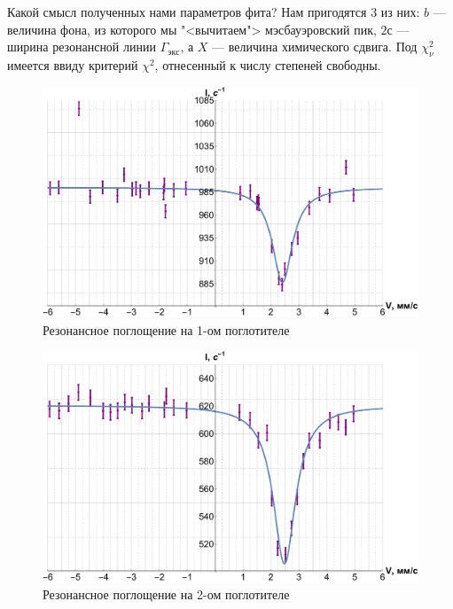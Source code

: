 \documentclass[12pt]{kiarticle}
\begin{document}
 	Какой смысл полученных нами параметров фита? Нам пригодятся 3 из них: $ b $ --- величина фона, из которого мы "<вычитаем"> мэсбауэровский пик, $ 2с $ --- ширина резонансной линии $ \Gamma_{экс} $, а $ X $ --- величина химического сдвига. Под $ \chi_\nu^2 $ имеется ввиду критерий $ \chi^2 $, отнесенный к числу степеней свободны.
 
 	\begin{figure}[h]
 		\label{graf_1}
 		\includegraphics[scale=0.47]{gr1.pdf}
 		\caption{Резонансное поглощение на 1-ом поглотителе}
 	\end{figure}
 
 	\begin{figure}[h]
 		\label{graf_2}
 		\includegraphics[scale=0.47]{gr2.pdf}
 		\caption{Резонансное поглощение на 2-ом поглотителе}
 	\end{figure}
 
\end{document}
